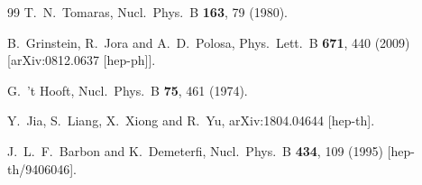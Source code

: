 \documentclass[showpacs,twocolumn,aps,preprintnumbers,letterpaper]{revtex4}
\begin{document}
\begin{thebibliography}{99}
  T.~N.~Tomaras,
  Nucl.\ Phys.\ B {\bf 163}, 79 (1980).

  B.~Grinstein, R.~Jora and A.~D.~Polosa,
  Phys.\ Lett.\ B {\bf 671}, 440 (2009)
  [arXiv:0812.0637 [hep-ph]].



  G.~'t Hooft,
  Nucl.\ Phys.\ B {\bf 75}, 461 (1974).



  Y.~Jia, S.~Liang, X.~Xiong and R.~Yu,
  arXiv:1804.04644 [hep-th].

  J.~L.~F.~Barbon and K.~Demeterfi,
  Nucl.\ Phys.\ B {\bf 434}, 109 (1995)
  [hep-th/9406046].




\end{thebibliography} \vfil
\end{document}
